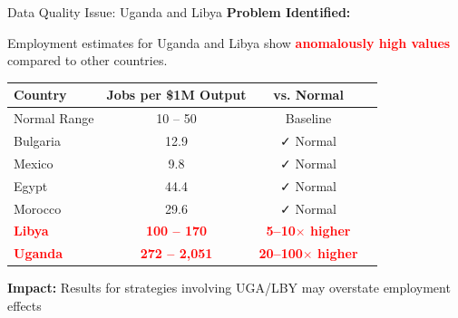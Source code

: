 \documentclass[10pt]{beamer}
\begin{document}
\begin{frame}{Data Quality Issue: Uganda and Libya}
\textbf{Problem Identified:}

\vspace{0.3cm}

Employment estimates for Uganda and Libya show \textcolor{red}{\textbf{anomalously high values}} compared to other countries.

\vspace{0.5cm}

\begin{table}[h]
\centering
\begin{tabular}{lccc}
\toprule
\textbf{Country} & \textbf{Jobs per \$1M Output} & \textbf{vs. Normal} \\
\midrule
Normal Range & 10 -- 50 & Baseline \\
\midrule
Bulgaria & 12.9 & ✓ Normal \\
Mexico & 9.8 & ✓ Normal \\
Egypt & 44.4 & ✓ Normal \\
Morocco & 29.6 & ✓ Normal \\
\midrule
\textcolor{red}{\textbf{Libya}} & \textcolor{red}{\textbf{100 -- 170}} & \textcolor{red}{\textbf{5--10$\times$ higher}} \\
\textcolor{red}{\textbf{Uganda}} & \textcolor{red}{\textbf{272 -- 2,051}} & \textcolor{red}{\textbf{20--100$\times$ higher}} \\
\bottomrule
\end{tabular}
\end{table}

\vspace{0.3cm}

\textbf{Impact:} Results for strategies involving UGA/LBY may overstate employment effects
\end{frame}
\end{document}
